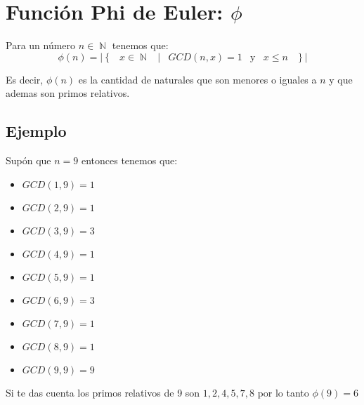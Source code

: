\documentclass[12pt, fleqn]{report}                             %
\DeclareMathOperator \Space {\quad}                             %
\DeclareMathOperator \MiniSpace {\;}                            %
\newcommand \Such {\MiniSpace|\MiniSpace}                       %
\newcommand \Also {\MiniSpace \text{y} \MiniSpace}              %
\newcommand{\Set}[1]{\left\{ \MiniSpace #1 \MiniSpace \right\}} %
\DeclareMathOperator \Naturals  {\mathbb{N}}                     %
\begin{document}
    \clearpage
    \section{Función Phi de Euler: $\phi$ }

        Para un número $n \in \Naturals$ tenemos que:
        \begin{equation}
            \phi(n) = 
                | \Set{ x \in \Naturals \Such GCD(n, x) = 1 \Also x \leq n } |
        \end{equation}
 
        Es decir, $\phi(n)$ es la cantidad de naturales que son menores o iguales a
        $n$ y que ademas son primos relativos.


        \subsection{Ejemplo}
            
            Supón que $n=9$ entonces tenemos que:

            \begin{itemize}
                \item $GCD(1, 9) = 1$
                \item $GCD(2, 9) = 1$
                \item $GCD(3, 9) = 3$
                \item $GCD(4, 9) = 1$
                \item $GCD(5, 9) = 1$
                \item $GCD(6, 9) = 3$
                \item $GCD(7, 9) = 1$
                \item $GCD(8, 9) = 1$
                \item $GCD(9, 9) = 9$
            \end{itemize}

            Si te das cuenta los primos relativos de 9 son $1,2,4,5,7,8$
            por lo tanto $\phi(9) = 6$





        \clearpage
\end{document}

